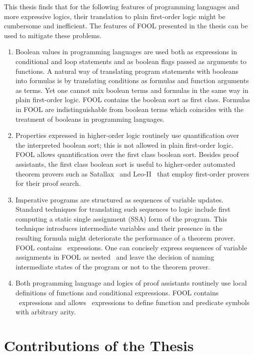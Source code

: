This thesis finds that for the following features of programming languages and more expressive logics, their translation to plain first-order logic might be cumbersome and inefficient. The features of FOOL presented in the thesis can be used to mitigate these problems.
\begin{enumerate}
  \item Boolean values in programming languages are used both as expressions in conditional and loop statements and as boolean flags passed as arguments to functions. A natural way of translating program statements with booleans into formulas is by translating conditions as formulas and function arguments as terms. Yet one cannot mix boolean terms and formulas in the same way in plain first-order logic. FOOL contains the boolean sort as first class. Formulas in FOOL are indistinguishable from boolean terms which coincides with the treatment of booleans in programming languages.
  \item Properties expressed in higher-order logic routinely use quantification over the interpreted boolean sort; this is not allowed in plain first-order logic. FOOL allows quantification over the first class boolean sort. Besides proof assistants, the first class boolean sort is useful to higher-order automated theorem provers such as Satallax~\cite{Satallax} and Leo-II~\cite{LeoII} that employ first-order provers for their proof search.
  \item Imperative programs are structured as sequences of variable updates. Standard techniques for translating such sequences to logic include first computing a static single assignment (SSA) form of the program. This technique introduces intermediate variables and their presence in the resulting formula might deteriorate the performance of a theorem prover. FOOL contains \LETIN\ expressions. One can concisely express sequences of variable assignments in FOOL as nested \LETIN\ and leave the decision of naming intermediate states of the program or not to the theorem prover.
  \item Both programming language and logics of proof assistants routinely use local definitions of functions and conditional expressions. FOOL contains \ITE\ expressions and allows \LETIN\ expressions to define function and predicate symbols with arbitrary arity.
\end{enumerate}

\section*{Contributions of the Thesis}
\label{sect:intro:contributions}

